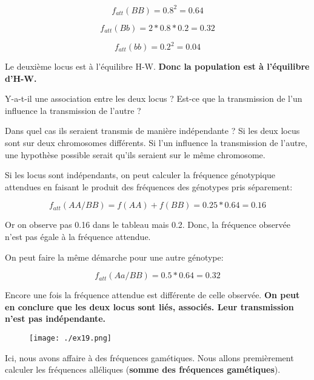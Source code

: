 \documentclass{article}
\begin{document}
\begin{equation}
f_{att}(BB) = 0.8^2 = 0.64
\end{equation}

\begin{equation}
f_{att}(Bb) = 2 * 0.8 * 0.2 = 0.32
\end{equation}

\begin{equation}
f_{att}(bb) = 0.2^2 = 0.04
\end{equation}

Le deuxième locus est à l'équilibre H-W. \textbf{Donc la population est à l'équilibre d'H-W.}


Y-a-t-il une association entre les deux locus ? Est-ce que la transmission de l'un influence la transmission de l'autre ? 

Dans quel cas ils seraient transmis de manière indépendante ? Si les deux locus sont sur deux chromosomes différents. Si l'un influence la transmission de l'autre, une hypothèse possible serait qu'ils seraient sur le même chromosome. 

Si les locus sont indépendants, on peut calculer la fréquence génotypique attendues en faisant le produit des fréquences des génotypes pris séparement:


\begin{equation}
f_{att}(AA/BB) = f(AA) + f(BB) = 0.25 * 0.64 = 0.16
\end{equation}

Or on observe pas 0.16 dans le tableau mais 0.2. Donc, la fréquence observée n'est pas égale à la fréquence attendue.

On peut faire la même démarche pour une autre génotype:

\begin{equation}
f_{att}(Aa/BB) = 0.5 * 0.64 = 0.32
\end{equation}

Encore une fois la fréquence attendue est différente de celle observée. \textbf{On peut en conclure que les deux locus sont liés, associés. Leur transmission n'est pas indépendante.}



\begin{figure}[H]
\texttt{[image: ./ex19.png]}
\end{figure}

Ici, nous avons affaire à des fréquences gamétiques. Nous allons premièrement calculer les fréquences alléliques (\textbf{somme des fréquences gamétiques}).
\end{document}
